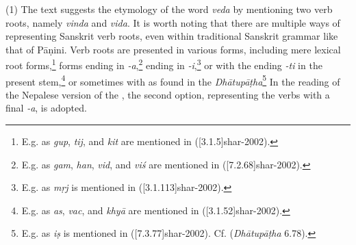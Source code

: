 (1) The text suggests the etymology of the word \emph{veda} by mentioning two verb roots, namely \emph{vinda} and \emph{vida}. 
	It is worth noting that there are multiple ways of representing Sanskrit verb roots, 
	even within traditional Sanskrit grammar like that of Pāṇini. 
	Verb roots are presented in various forms, including mere lexical root forms,\footnote{
		E.g. as \root \emph{gup}, \root \emph{tij}, and \root \emph{kit} are mentioned in 
			 (\volcite{}[3.1.5]{shar-2002}).}	 		
   forms ending in \emph{-a},\footnote{
 		 		E.g. as \root \emph{gam}, \root \emph{han}, \root \emph{vid}, and \root \emph{viś} are mentioned in  (\volcite{}[7.2.68]{shar-2002}).}	 		 
 		 ending in \emph{-i},\footnote{ 
 		E.g. as \root \emph{mṛj} is mentioned in  (\volcite{}[3.1.113]{shar-2002}).}	 		 
	  or with the ending \emph{-ti} in the present stem,\footnote{
  		E.g. as \root \emph{as}, \root \emph{vac}, and \root \emph{khyā} are mentioned in
   		 (\volcite[]{}[3.1.52]{shar-2002}).} 		   
	    or sometimes with  as found in the \emph{Dhātupāṭha}\footnote{
   		E.g. as \root \emph{iṣ} is mentioned in  ([7.3.77]{shar-2002}). 
   		Cf.  (\emph{Dhātupāṭha} 6.78).} 
	In the reading of the Nepalese version of the \SS, the second option, 
	representing the verbs with a final \emph{-a}, is adopted. 
	 		
